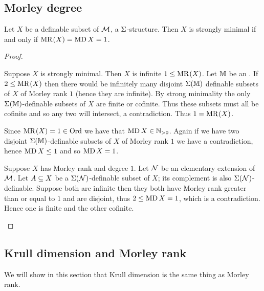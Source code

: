 \subsection{Morley degree}
\begin{prop}
    Let $X$ be a definable subset of $\mathcal{M}$, a $\Sigma$-structure.
    Then $X$ is strongly minimal if and only if $\mathrm{MR}^{}(X) = \operatorname{MD}{X} = 1$.
\end{prop}
\begin{proof}
    \begin{forward}
        Suppose $X$ is strongly minimal.
        Then $X$ is infinite 
         $1 \leq \mathrm{MR}^{}(X)$.
        Let $\mathbb{M}$ be an 
        .
        If $2 \leq \mathrm{MR}^{}(X)$ then there would be infinitely many 
        disjoint $\Sigma(\mathbb{M})$ definable subsets of $X$ of Morley rank $1$
        (hence they are infinite).
        By strong minimality the only 
        $\Sigma(\mathbb{M})$-definable subsets of $X$ are finite or cofinite.
        Thus these subsets must all be cofinite
        and so any two will intersect, a contradiction.
        Thus $1 = \mathrm{MR}^{}(X)$.

        Since $\mathrm{MR}^{}(X) = 1 \in \operatorname{Ord}$ we have that $\operatorname{MD}{X} \in \mathbb{N}_{>0}$.
        Again if we have two disjoint 
        $\Sigma(\mathbb{M})$-definable subsets of $X$ of Morley rank $1$ 
        we have a contradiction, hence $\operatorname{MD}{X} \leq 1$ and so $\operatorname{MD}{X} = 1$.
    \end{forward}

    \begin{backward}
        Suppose $X$ has Morley rank and degree $1$.
        Let $\mathcal{N}$ be an elementary extension of $\mathcal{M}$. 
        Let $A \subseteq X$ be a $\Sigma(\mathcal{N})$-definable subset of $X$;
        its complement is also $\Sigma(\mathcal{N})$-definable.
        Suppose both are infinite then they both have Morley rank greater 
        than or equal to $1$ and are disjoint,
        thus $2 \leq \operatorname{MD}{}{X} = 1$, which is a contradiction.
        Hence one is finite and the other cofinite.
    \end{backward}
\end{proof}

\subsection{Krull dimension and Morley rank}
We will show in this section that Krull dimension is the same thing as Morley
rank.

